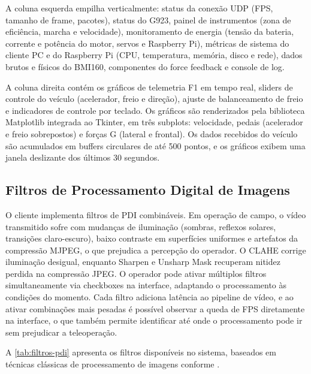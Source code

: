 A coluna esquerda empilha verticalmente: status da conexão \gls{UDP} (FPS, tamanho de frame, pacotes), status do G923, painel de instrumentos (zona de eficiência, marcha e velocidade), monitoramento de energia (tensão da bateria, corrente e potência do motor, servos e Raspberry Pi), métricas de sistema do cliente PC e do Raspberry Pi (CPU, temperatura, memória, disco e rede), dados brutos e físicos do BMI160, componentes do force feedback e console de log.

A coluna direita contém os gráficos de telemetria F1 em tempo real, sliders de controle do veículo (acelerador, freio e direção), ajuste de balanceamento de freio e indicadores de controle por teclado. Os gráficos são renderizados pela biblioteca Matplotlib integrada ao Tkinter, em três subplots: velocidade, pedais (acelerador e freio sobrepostos) e forças G (lateral e frontal). Os dados recebidos do veículo são acumulados em buffers circulares de até 500 pontos, e os gráficos exibem uma janela deslizante dos últimos 30 segundos.

\subsection{Filtros de Processamento Digital de Imagens}
\label{subsec:filtros-pdi}

O cliente implementa filtros de \gls{PDI} combináveis. Em operação de campo, o vídeo transmitido sofre com mudanças de iluminação (sombras, reflexos solares, transições claro-escuro), baixo contraste em superfícies uniformes e artefatos da compressão \gls{MJPEG}, o que prejudica a percepção do operador. O \gls{CLAHE} corrige iluminação desigual, enquanto Sharpen e Unsharp Mask recuperam nitidez perdida na compressão JPEG. O operador pode ativar múltiplos filtros simultaneamente via checkboxes na interface, adaptando o processamento às condições do momento. Cada filtro adiciona latência ao pipeline de vídeo, e ao ativar combinações mais pesadas é possível observar a queda de FPS diretamente na interface, o que também permite identificar até onde o processamento pode ir sem prejudicar a teleoperação.

A \autoref{tab:filtros-pdi} apresenta os filtros disponíveis no sistema, baseados em técnicas clássicas de processamento de imagens conforme .

